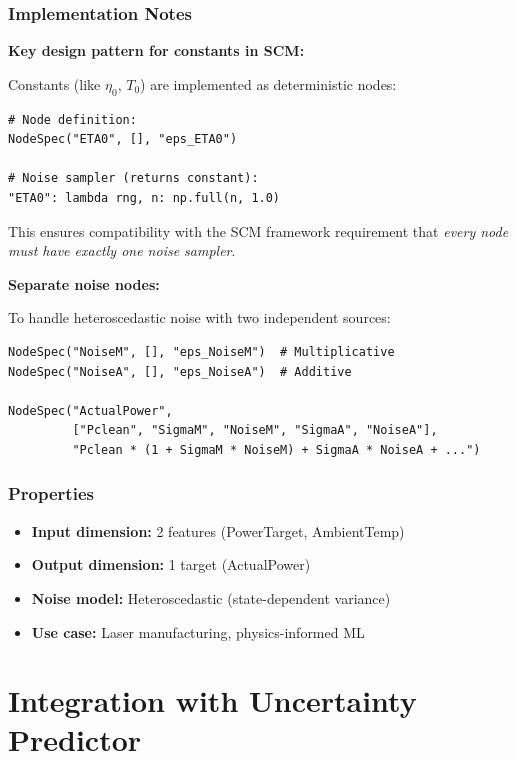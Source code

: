 \documentclass[11pt,a4paper]{article}
\begin{document}
\subsubsection{Implementation Notes}

\textbf{Key design pattern for constants in SCM:}

Constants (like $\eta_0$, $T_0$) are implemented as deterministic nodes:
\begin{lstlisting}
# Node definition:
NodeSpec("ETA0", [], "eps_ETA0")

# Noise sampler (returns constant):
"ETA0": lambda rng, n: np.full(n, 1.0)
\end{lstlisting}

This ensures compatibility with the SCM framework requirement that \emph{every node must have exactly one noise sampler}.

\textbf{Separate noise nodes:}

To handle heteroscedastic noise with two independent sources:
\begin{lstlisting}
NodeSpec("NoiseM", [], "eps_NoiseM")  # Multiplicative
NodeSpec("NoiseA", [], "eps_NoiseA")  # Additive

NodeSpec("ActualPower",
         ["Pclean", "SigmaM", "NoiseM", "SigmaA", "NoiseA"],
         "Pclean * (1 + SigmaM * NoiseM) + SigmaA * NoiseA + ...")
\end{lstlisting}

\subsubsection{Properties}

\begin{itemize}
    \item \textbf{Input dimension:} 2 features (PowerTarget, AmbientTemp)
    \item \textbf{Output dimension:} 1 target (ActualPower)
    \item \textbf{Noise model:} Heteroscedastic (state-dependent variance)
    \item \textbf{Use case:} Laser manufacturing, physics-informed ML
\end{itemize}

\section{Integration with Uncertainty Predictor}
\end{document}
